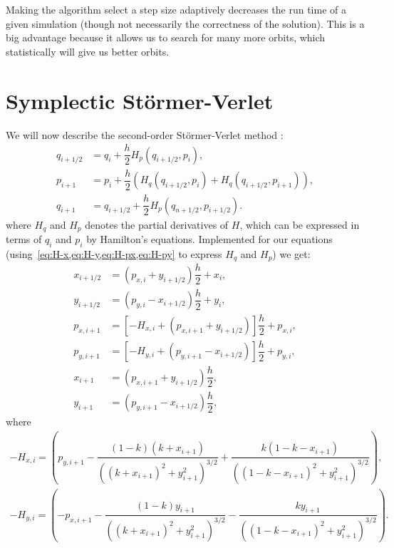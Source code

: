 Making the algorithm select a step size adaptively decreases the run time of a given simulation (though not necessarily the correctness of the solution). This is a big advantage because it allows us to search for many more orbits, which statistically will give us better orbits.

\section{Symplectic Störmer-Verlet}
We will now describe the second-order Störmer-Verlet method \cite{Hochbruck2008}:
\begin{align}
q_{i+1/2} &= q_i + \dfrac{h}{2}H_p(q_{i+1/2}, p_i), \\
p_{i+1} &= p_i + \dfrac{h}{2}(H_q(q_{i+1/2}, p_i) + H_q(q_{i+1/2}, p_{i+1})), \\
q_{i+1} &= q_{i+1/2} + \dfrac{h}{2}H_p(q_{n+1/2}, p_{i+1/2}).
\end{align}
where $H_q$ and $H_p$ denotes the partial derivatives of $H$, which can be expressed in terms of $q_i$ and $p_i$ by Hamilton's equations. Implemented for our equations (using~\cref{eq:H-x,eq:H-y,eq:H-px,eq:H-py} to express $H_q$ and $H_p$) we get:
\begin{align}
x_{i+1/2} &= (p_{x,i} + y_{i+1/2})\dfrac{h}{2} + x_i, \\[0.3cm]
y_{i+1/2} &= (p_{y,i} - x_{i+1/2})\dfrac{h}{2} + y_i, \\[0.8cm]
%
%
p_{x,i+1} &= \left[-H_{x,i} + (p_{x,i+1} + y_{i+1/2}) \right]\dfrac{h}{2} + p_{x,i}, \\[0.3cm]
%
p_{y,i+1} &= \left[-H_{y,i} + (p_{y,i+1} -x_{i+1/2}) \right]\dfrac{h}{2} + p_{y,i},\\[0.8cm]
%
%
x_{i+1} &= (p_{x,i+1} + y_{i+1/2})\dfrac{h}{2}, \\[0.3cm]
y_{i+1} &= (p_{y,i+1} - x_{i+1/2})\dfrac{h}{2},
\end{align}
where
\begin{align}
-H_{x,i} = \left(p_{y,i+1} - \dfrac{(1-k)(k+x_{i+1})}{((k+x_{i+1})^2+y_{i+1}^2)^{3/2}} + \dfrac{k(1-k-x_{i+1})}{((1-k-x_{i+1})^2+y_{i+1}^2)^{3/2}}\right), \\[0.5cm]
-H_{y,i} = \left(-p_{x,i+1} - \dfrac{(1-k)y_{i+1}}{((k+x_{i+1})^2+y_{i+1}^2)^{3/2}} - \dfrac{k y_{i+1}}{((1-k-x_{i+1})^2+y_{i+1}^2)^{3/2}}\right).
\end{align}


